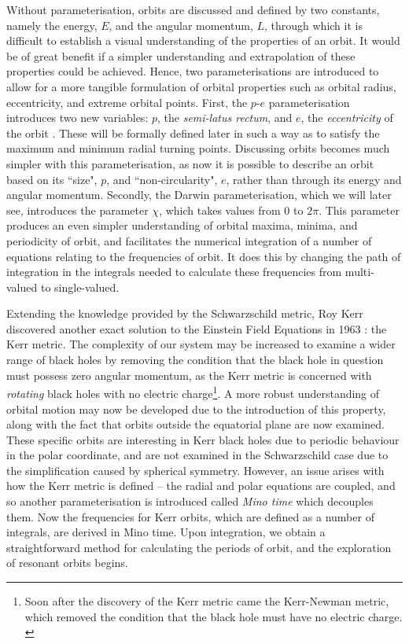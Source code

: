 Without parameterisation, orbits are discussed and defined by two constants, namely the energy, $E$, and the angular momentum, $L$, through which it is difficult to establish a visual understanding of the properties of an orbit.
It would be of great benefit if a simpler understanding and extrapolation of these properties could be achieved.
Hence, two parameterisations are introduced to allow for a more tangible formulation of orbital properties such as orbital radius, eccentricity, and extreme orbital points.
First, the $p$-$e$ parameterisation introduces two new variables: $p$, the \textit{semi-latus rectum}, and $e$, the \textit{eccentricity} of the orbit \cite{cutlerEtAl}.
These will be formally defined later in such a way as to satisfy the maximum and minimum radial turning points.
Discussing orbits becomes much simpler with this parameterisation, as now it is possible to describe an orbit based on its ``size", $p$, and ``non-circularity", $e$, rather than through its energy and angular momentum.
Secondly, the Darwin parameterisation, which we will later see, introduces the parameter $\chi$, which takes values from $0$ to $2\pi$.
This parameter produces an even simpler understanding of orbital maxima, minima, and periodicity of orbit, and facilitates the numerical integration of a number of equations relating to the frequencies of orbit.
It does this by changing the path of integration in the integrals needed to calculate these frequencies from multi-valued to single-valued.


Extending the knowledge provided by the Schwarzschild metric, Roy Kerr discovered another exact solution to the Einstein Field Equations in 1963 \cite{kerrMetric}: the Kerr metric.
The complexity of our system may be increased to examine a wider range of black holes by removing the condition that the black hole in question must possess zero angular momentum, as the Kerr metric is concerned with \textit{rotating} black holes with no electric charge\footnote{Soon after the discovery of the Kerr metric came the Kerr-Newman metric, which removed the condition that the black hole must have no electric charge. \cite{kerrNewmanMetric}}.
A more robust understanding of orbital motion may now be developed due to the introduction of this property, along with the fact that orbits outside the equatorial plane are now examined.
These specific orbits are interesting in Kerr black holes due to periodic behaviour in the polar coordinate, and are not examined in the Schwarzschild case due to the simplification caused by spherical symmetry.
However, an issue arises with how the Kerr metric is defined -- the radial and polar equations are coupled, and so another parameterisation is introduced called \textit{Mino time} which decouples them.
Now the frequencies for Kerr orbits, which are defined as a number of integrals, are derived in Mino time.
Upon integration, we obtain a straightforward method for calculating the periods of orbit, and the exploration of resonant orbits begins.

